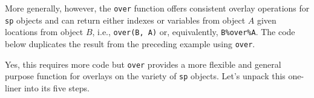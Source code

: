 \documentclass[
]{krantz}
\makeatletter
\newenvironment{Shaded}{\begin{snugshade}}{\end{snugshade}}
\newcommand{\FloatTok}[1]{\textcolor[rgb]{0.06,0.06,0.06}{#1}}
\newcommand{\KeywordTok}[1]{\textcolor[rgb]{0.27,0.27,0.27}{\textbf{#1}}}
\newcommand{\NormalTok}[1]{#1}
\newcommand{\OperatorTok}[1]{\textcolor[rgb]{0.43,0.43,0.43}{\textbf{#1}}}
\newcommand{\StringTok}[1]{\textcolor[rgb]{0.5,0.5,0.5}{#1}}
\newenvironment{kframe}{%
\medskip{}
\setlength{\fboxsep}{.8em}
 \def\at@end@of@kframe{}%
 \ifinner\ifhmode%
  \def\at@end@of@kframe{\end{minipage}}%
  \begin{minipage}{\columnwidth}%
 \fi\fi%
 \def\FrameCommand##1{\hskip\@totalleftmargin \hskip-\fboxsep
 \colorbox{shadecolor}{##1}\hskip-\fboxsep
     \hskip-\linewidth \hskip-\@totalleftmargin \hskip\columnwidth}%
 \MakeFramed {\advance\hsize-\width
   \@totalleftmargin\z@ \linewidth\hsize
   \@setminipage}}%
 {\par\unskip\endMakeFramed%
 \at@end@of@kframe}
\renewenvironment{Shaded}{\begin{kframe}}{\end{kframe}}
\makeatother
\begin{document}
More generally, however, the \texttt{over} function offers consistent overlay operations for \texttt{sp} objects and can return either indexes or variables from object \(A\) given locations from object \(B\), i.e., \texttt{over(B,\ A)} or, equivalently, \texttt{B\%over\%A}. The code below duplicates the result from the preceding example using \texttt{over}.

\begin{Shaded}
\end{Shaded}

Yes, this requires more code but \texttt{over} provides a more flexible and general purpose function for overlays on the variety of \texttt{sp} objects. Let's unpack this one-liner into its five steps.

\begin{Shaded}
\end{Shaded}
\end{document}
